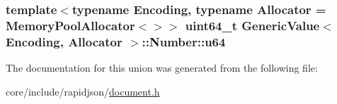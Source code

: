 \subsubsection[{\texorpdfstring{u64}{u64}}]{\setlength{\rightskip}{0pt plus 5cm}template$<$typename Encoding, typename Allocator = Memory\+Pool\+Allocator$<$$>$$>$ {\bf uint64\+\_\+t} {\bf Generic\+Value}$<$ Encoding, Allocator $>$\+::Number\+::u64}\hypertarget{unionGenericValue_1_1Number_a1c8d3c6d226cf74315e233b30b622430}{}\label{unionGenericValue_1_1Number_a1c8d3c6d226cf74315e233b30b622430}


The documentation for this union was generated from the following file\+:\begin{DoxyCompactItemize}
\item 
core/include/rapidjson/\hyperlink{document_8h}{document.\+h}\end{DoxyCompactItemize}
